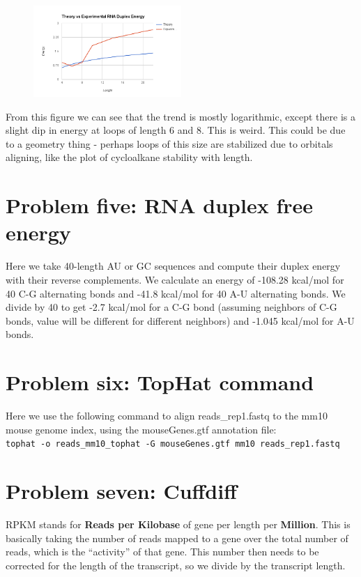 \documentclass[10pt]{article} %
\begin{document}
\begin{figure}[h!]
  \caption{}
  \centering
  \includegraphics[width=0.5\textwidth]{../duplex_energy.png}
\end{figure}

From this figure we can see that the trend is mostly logarithmic, except there is a
slight dip in energy at loops of length 6 and 8. This is weird. This could be due to
a geometry thing - perhaps loops of this size are stabilized due to orbitals aligning,
like the plot of cycloalkane stability with length.\\

\section{Problem five: RNA duplex free energy}
Here we take 40-length AU or GC sequences and compute their duplex energy with their
reverse complements. We calculate an energy of -108.28 kcal/mol for 40 C-G alternating
bonds and -41.8 kcal/mol for 40 A-U alternating bonds. We divide by 40 to get -2.7
kcal/mol for a C-G bond (assuming neighbors of C-G bonds, value will be different
for different neighbors) and -1.045 kcal/mol for A-U bonds.\\

\section{Problem six: TopHat command}
Here we use the following command to align reads\_rep1.fastq to the mm10 mouse genome
index, using the mouseGenes.gtf annotation file:\\

\texttt{tophat -o reads\_mm10\_tophat
  -G mouseGenes.gtf mm10 reads\_rep1.fastq}

\section{Problem seven: Cuffdiff}
RPKM stands for \textbf{Reads per Kilobase} of gene per length per \textbf{Million}.
This is basically taking the number of reads mapped to a gene over the total number
of reads, which is the ``activity'' of that gene. This number then needs to be corrected
for the length of the transcript, so we divide by the transcript length.\\
\end{document}
